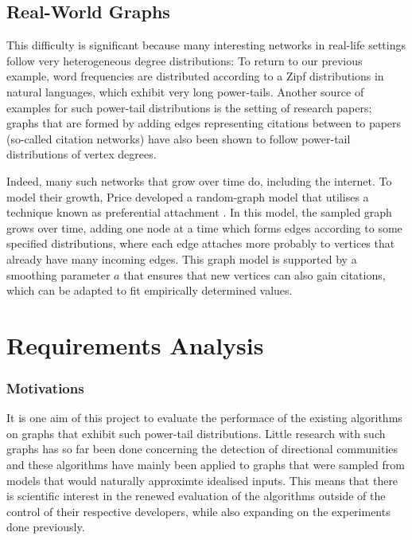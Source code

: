 \subsection{Real-World Graphs}
This difficulty is significant because many interesting networks in real-life settings 
follow very heterogeneous degree distributions: To return to our previous example, word frequencies
are distributed according to a Zipf distributions in natural languages, which exhibit very 
long power-tails. Another source of examples for such power-tail distributions is the setting of 
research papers; graphs that are formed by adding edges representing citations between to papers 
(so-called citation networks) have also been shown to follow power-tail distributions of vertex 
degrees. 

Indeed, many such networks that grow over time do, including the internet. To model their growth, 
Price developed a random-graph model that utilises a technique known as preferential attachment \cite{price}. 
In this model, the sampled graph grows over time, adding one node at a time which forms edges 
according to some specified distributions, where each edge attaches more probably to vertices that
already have many incoming edges. This graph model is supported by a smoothing parameter $a$ that 
ensures that new vertices can also gain citations, which can be adapted to fit empirically determined
values.

\section{Requirements Analysis}

\subsubsection{Motivations}
It is one aim of this project to evaluate the performace of the existing algorithms on graphs 
that exhibit such power-tail distributions. Little research with such graphs has so far been done
concerning the detection of directional communities and these algorithms have mainly been applied to 
graphs that were sampled from models that would naturally approximte idealised inputs.
This means that there is scientific interest in the renewed evaluation of the algorithms outside of
the control of their respective developers, while also expanding on the experiments done previously.


